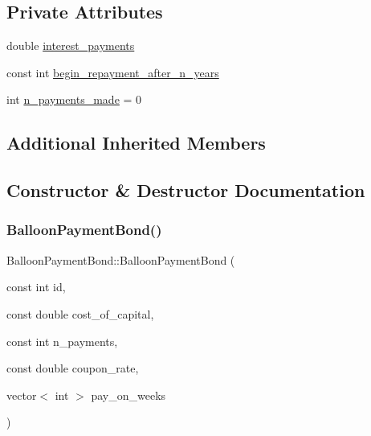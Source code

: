 \subsection*{Private Attributes}
\begin{DoxyCompactItemize}
\item 
double \mbox{\hyperlink{classBalloonPaymentBond_ac73d3ec9b640614f454d8cc8bd1ebbc3_ac73d3ec9b640614f454d8cc8bd1ebbc3}{interest\+\_\+payments}}
\item 
const int \mbox{\hyperlink{classBalloonPaymentBond_a7e1e064643021755eda4873b0c98e434_a7e1e064643021755eda4873b0c98e434}{begin\+\_\+repayment\+\_\+after\+\_\+n\+\_\+years}}
\item 
int \mbox{\hyperlink{classBalloonPaymentBond_a82255e2f56110503d126fefbbc192d67_a82255e2f56110503d126fefbbc192d67}{n\+\_\+payments\+\_\+made}} = 0
\end{DoxyCompactItemize}
\subsection*{Additional Inherited Members}


\subsection{Constructor \& Destructor Documentation}
\mbox{\label{classBalloonPaymentBond_a03b25124896e67f851a35721c37705fe_a03b25124896e67f851a35721c37705fe}} 
\subsubsection{\texorpdfstring{Balloon\+Payment\+Bond()}{BalloonPaymentBond()}\hspace{0.1cm}{\footnotesize\ttfamily [1/2]}}
{\footnotesize\ttfamily Balloon\+Payment\+Bond\+::\+Balloon\+Payment\+Bond (\begin{DoxyParamCaption}\item[{const int}]{id,  }\item[{const double}]{cost\+\_\+of\+\_\+capital,  }\item[{const int}]{n\+\_\+payments,  }\item[{const double}]{coupon\+\_\+rate,  }\item[{vector$<$ int $>$}]{pay\+\_\+on\+\_\+weeks }\end{DoxyParamCaption})}


